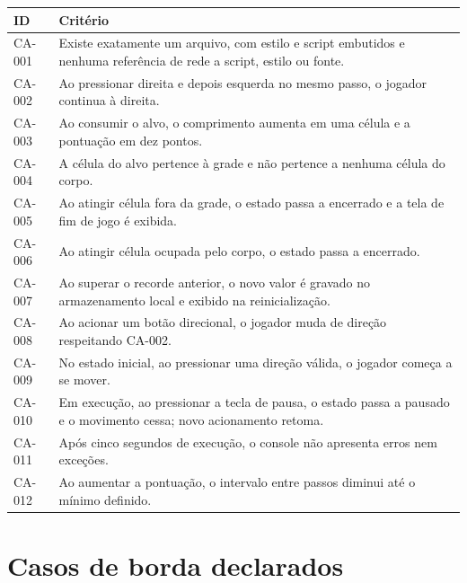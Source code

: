 \begin{quadro}[htb]
	\caption{Critérios de aceitação do sistema-alvo}
	\label{qua:ca}
	\centering
	\scriptsize
	\begin{tabularx}{\textwidth}{@{}p{1.4cm} X@{}}
		\toprule
		\textbf{ID} & \textbf{Critério} \\
		\midrule
		CA-001 & Existe exatamente um arquivo, com estilo e script embutidos e nenhuma referência de rede a script, estilo ou fonte. \\
		\addlinespace
		CA-002 & Ao pressionar direita e depois esquerda no mesmo passo, o jogador continua à direita. \\
		\addlinespace
		CA-003 & Ao consumir o alvo, o comprimento aumenta em uma célula e a pontuação em dez pontos. \\
		\addlinespace
		CA-004 & A célula do alvo pertence à grade e não pertence a nenhuma célula do corpo. \\
		\addlinespace
		CA-005 & Ao atingir célula fora da grade, o estado passa a encerrado e a tela de fim de jogo é exibida. \\
		\addlinespace
		CA-006 & Ao atingir célula ocupada pelo corpo, o estado passa a encerrado. \\
		\addlinespace
		CA-007 & Ao superar o recorde anterior, o novo valor é gravado no armazenamento local e exibido na reinicialização. \\
		\addlinespace
		CA-008 & Ao acionar um botão direcional, o jogador muda de direção respeitando CA-002. \\
		\addlinespace
		CA-009 & No estado inicial, ao pressionar uma direção válida, o jogador começa a se mover. \\
		\addlinespace
		CA-010 & Em execução, ao pressionar a tecla de pausa, o estado passa a pausado e o movimento cessa; novo acionamento retoma. \\
		\addlinespace
		CA-011 & Após cinco segundos de execução, o console não apresenta erros nem exceções. \\
		\addlinespace
		CA-012 & Ao aumentar a pontuação, o intervalo entre passos diminui até o mínimo definido. \\
		\bottomrule
	\end{tabularx}
\end{quadro}

\section{Casos de borda declarados}
\label{sec:esp-bordas}

